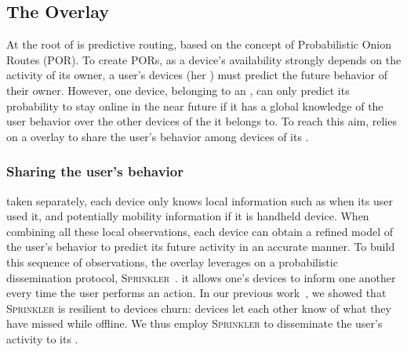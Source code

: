 \subsection{The \squad Overlay} 
\label{sec:squad_overlay}

At the root of \name is predictive routing, based on the concept of Probabilistic Onion Routes (POR).
To create PORs, as a device's availability strongly depends on the activity of its owner,
 a user's devices (her \squad) must predict the future behavior of their owner. 
However, one device, belonging to an \squad, can only predict its probability to stay online in the near future
if it has a global knowledge of the user behavior over the other devices of the \squad it belongs to.
To reach this aim, \name relies on a \squad overlay to share the user's behavior among devices of its \squad.





\subsubsection{Sharing the user's behavior} %
\label{sub:sharing_knowledge}

taken separately, each device only knows local information such as when its user used it, and potentially mobility information if it is handheld device. When combining all these local observations, each device can obtain a refined model of the user’s behavior to predict its future activity in an accurate manner. To build this sequence of observations, 
the \squad overlay leverages on a probabilistic dissemination protocol, \textsc{Sprinkler}~\cite{luxey:hal-01704172}.
it allows one's devices to inform one another every time the user performs an action.
In our previous work~\cite{luxey:cascade}, we showed that \textsc{Sprinkler} is resilient to devices churn: 
devices let each other know of what they have missed while offline.
We thus employ \textsc{Sprinkler} to disseminate the user's activity to its \squad.

